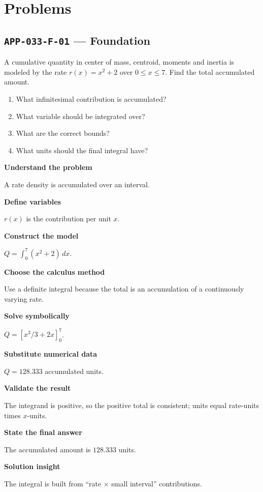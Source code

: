 \documentclass[11pt]{book}
\newcommand{\pid}[1]{\texttt{#1}}
\begin{document}
\section*{Problems}
\subsection*{\pid{APP-033-F-01} — Foundation}
\begin{problembox}
A cumulative quantity in center of mass, centroid, moments and inertia is modeled by the rate $r(x)=x^2+2$ over $0\le x\le 7$. Find the total accumulated amount.
\end{problembox}
\begin{promptbox}\begin{enumerate}
\item What infinitesimal contribution is accumulated?
\item What variable should be integrated over?
\item What are the correct bounds?
\item What units should the final integral have?
\end{enumerate}\end{promptbox}
\begin{solutionbox}
\textbf{Understand the problem}\par A rate density is accumulated over an interval.\par\medskip
\textbf{Define variables}\par $r(x)$ is the contribution per unit $x$.\par\medskip
\textbf{Construct the model}\par $Q=\int_0^{7}(x^2+2)\,dx$.\par\medskip
\textbf{Choose the calculus method}\par Use a definite integral because the total is an accumulation of a continuously varying rate.\par\medskip
\textbf{Solve symbolically}\par $Q=[x^3/3+2x]_0^{7}$.\par\medskip
\textbf{Substitute numerical data}\par $Q=128.333$ accumulated units.\par\medskip
\textbf{Validate the result}\par The integrand is positive, so the positive total is consistent; units equal rate-units times $x$-units.\par\medskip
\textbf{State the final answer}\par The accumulated amount is $128.333$ units.\par\medskip
\textbf{Solution insight}\par The integral is built from “rate × small interval” contributions.\par\medskip
\end{solutionbox}
\end{document}
